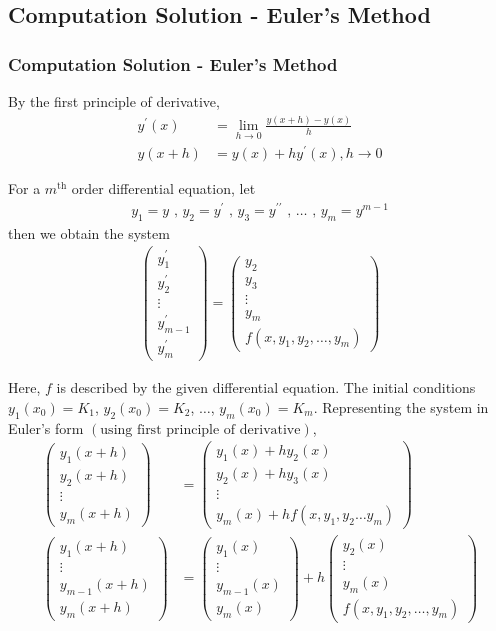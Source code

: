 \documentclass{beamer}
\providecommand{\brak}[1]{\ensuremath{\left(#1\right)}}
\theoremstyle{remark}
\newcommand{\myvec}[1]{\ensuremath{\begin{pmatrix}#1\end{pmatrix}}}
\numberwithin{equation}{section}
\begin{document}
\subsection{Computation Solution - Euler's Method}
\begin{frame}
\frametitle{Computation Solution - Euler's Method}
By the first principle of derivative,
\begin{align}
    y^{\prime}\brak{x} &= \lim_{h\to0} \frac{y\brak{x + h} - y\brak{x}}{h}\\
    y\brak{x + h} &= y\brak{x} + hy^{\prime}\brak{x}, h\to0
\end{align}

For a $m^{\text{th}}$ order differential equation, let 
\begin{align}
    y_1 = y \text{ , } y_2 = y^{\prime} \text{ , } y_3 = y^{\prime\prime} \text{ , } \dots \text{ , } y_m = y^{m - 1}
\end{align}
then we obtain the system
\begin{align}
    \myvec{y_1^{\prime}\\y_2^{\prime}\\\vdots\\y_{m - 1}^{\prime}\\y_m^{\prime}} = \myvec{y_2\\y_3\\\vdots\\y_m\\f\brak{x, y_1, y_2,\dots,y_m}}
\end{align}
\end{frame}

\begin{frame}
Here, $f$ is described by the given differential equation. The initial conditions $y_1\brak{x_0} = K_1$, $y_2\brak{x_0} = K_2$, $\dots$, $y_m\brak{x_0} = K_m$.
Representing the system in Euler's form \brak{\text{using first principle of derivative}},
\begin{align}
    \myvec{y_1\brak{x + h}\\y_2\brak{x + h}\\\vdots\\y_m\brak{x + h}} &= \myvec{y_1\brak{x} + hy_2\brak{x}\\y_2\brak{x} + hy_3\brak{x}\\\vdots\\y_m\brak{x} + hf\brak{x, y_1, y_2 \dots y_m}}\\
    \myvec{y_1\brak{x+h} \\ \vdots \\ y_{m-1}\brak{x+h} \\ y_m\brak{x+h}} &=\myvec{y_1\brak{x} \\ \vdots \\ y_{m-1}\brak{x} \\ y_m\brak{x}} + h\myvec{y_2\brak{x} \\ \vdots \\ y_m\brak{x} \\f\brak{x, y_1, y_2, \dots, y_m} }
\end{align}
\end{frame}
\end{document}
